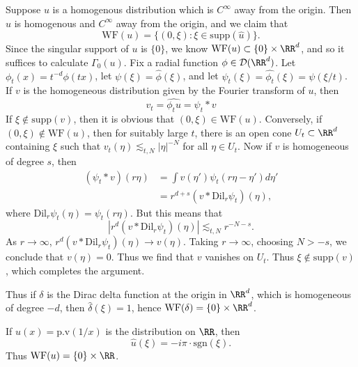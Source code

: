 \begin{example}
  Suppose $u$ is a homogenous distribution which is $C^\infty$ away from the origin. Then $\widehat{u}$ is homogenous and $C^\infty$ away from the origin, and we claim that
  \[ \text{WF}(u) = \{ (0,\xi): \xi \in \text{supp}(\widehat{u}) \}. \]
  Since the singular support of $u$ is $\{ 0 \}$, we know $\text{WF}(u) \subset \{ 0 \} \times \RR^d$, and so it suffices to calculate $\Gamma_0(u)$. Fix a radial function $\phi \in \mathcal{D}(\RR^d)$. Let $\phi_t(x) = t^{-d} \phi(tx)$, let $\psi(\xi) = \widehat{\phi}(\xi)$, and let $\psi_t(\xi) = \widehat{\phi_t}(\xi) = \psi(\xi/t)$. If $v$ is the homogeneous distribution given by the Fourier transform of $u$, then
  \[ v_t = \widehat{\phi_t u} = \psi_t * v \]
  If $\xi \notin \text{supp}(v)$, then it is obvious that $(0,\xi) \in \text{WF}(u)$. Conversely, if $(0,\xi) \notin \text{WF}(u)$, then for suitably large $t$, there is an open cone $U_t \subset \RR^d$ containing $\xi$ such that $v_t(\eta) \lesssim_{t,N} |\eta|^{-N}$ for all $\eta \in U_t$. Now if $v$ is homogeneous of degree $s$, then
  \begin{align*}
    (\psi_t * v)(r \eta) &= \int v(\eta') \psi_t \left( r \eta - \eta' \right) d \eta'\\
    &= r^{d+s} (v * \text{Dil}_r \psi_t)(\eta),
  \end{align*}
  where $\text{Dil}_r \psi_t(\eta) = \psi_t(r\eta)$. But this means that
  \[ |r^d (v * \text{Dil}_r \psi_t)(\eta)| \lesssim_{t,N} r^{-N-s}. \]
  As $r \to \infty$, $r^d (v * \text{Dil}_r \psi_t)(\eta) \to v(\eta)$. Taking $r \to \infty$, choosing $N > -s$, we conclude that $v(\eta) = 0$. Thus we find that $v$ vanishes on $U_t$. Thus $\xi \not \in \text{supp}(v)$, which completes the argument.
\end{example}

\begin{example}
    Thus if $\delta$ is the Dirac delta function at the origin in $\RR^d$, which is homogeneous of degree $-d$, then $\widehat{\delta}(\xi) = 1$, hence $\text{WF}(\delta) = \{ 0 \} \times \RR^d$.
\end{example}

\begin{example}
    If $u(x) = \text{p.v}(1/x)$ is the distribution on $\RR$, then
    \[ \widehat{u}(\xi) = -i \pi \cdot \text{sgn}(\xi). \]
    Thus $\text{WF}(u) = \{ 0 \} \times \RR$.
\end{example}

